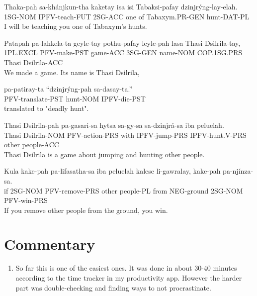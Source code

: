 \documentclass{thiguka}
\begin{document}
\begin{exe}
\ex{} \gll{}Thaka-pah sa-khánjkun-tha kaketay isa isi Tabaksi-pafay  dzinjrýng-lay-elah.\\
            1SG-NOM   IPFV-teach-FUT  2SG-ACC one of  Tabaxym.PR-GEN hunt-DAT-PL\\
      \glt{}I will be teaching you one of Tabaxym's hunts.
\end{exe}

\begin{exe}
\ex{} \gll{}Patapah  pa-lahkela-ta geyle-tay pothu-pafay leyle-pah lasa        Thasi Dsilrila-tay,\\
            1PL.EXCL PFV-make-PST  game-ACC  3SG-GEN     name-NOM  COP.1SG.PRS Thasi Dsilrila-ACC\\
      \glt{}We made a game. Its name is Thasi Dsilrila,
\end{exe}

\begin{exe}
\ex{} \gll{}pa-patiray-ta     ``dzinjrýng-pah sa-dasay-ta.''\\
            PFV-translate-PST  hunt-NOM      IPFV-die-PST\\
      \glt{}translated to "deadly hunt".
\end{exe}

\begin{exe}
\ex{} \gll{}Thasi Dsilrila-pah pa-gasari-sa   hytsa sa-gy-sa      sa-dzinjrá-sa   iba   peluelah.\\
            Thasi Dsilrila-NOM PFV-action-PRS with  IPFV-jump-PRS IPFV-hunt.V-PRS other people-ACC\\
      \glt{}Thasi Dsilrila is a game about jumping and hunting other people.
\end{exe}

\begin{exe}
\ex{} \gll{}Kula kake-pah pa-lifasatha-sa iba   peluelah  kalese li-gawralay, kake-pah pa-njínza-sa.\\
            if   2SG-NOM  PFV-remove-PRS  other people-PL from   NEG-ground   2SG-NOM  PFV-win-PRS\\
      \glt{}If you remove other people from the ground, you win.
\end{exe}

\section{Commentary}
\begin{enumerate}
    \item So far this is one of the easiest ones. It was done in about 30-40 minutes according to the time tracker in my productivity app. However the harder part was double-checking and finding ways to not procrastinate.
\end{enumerate}
\end{document}
